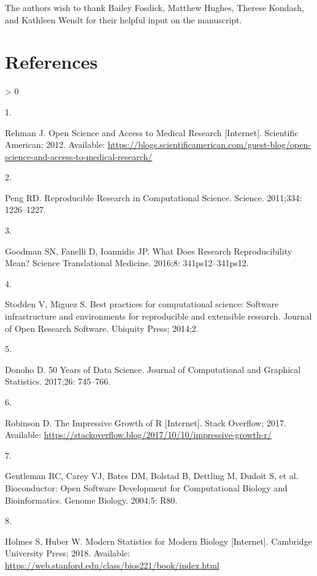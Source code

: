 \documentclass[10pt,letterpaper]{article}
\newlength{\csllabelwidth}
\newlength{\cslhangindent}
\newenvironment{CSLReferences}[3] %
 {%
  \setlength{\parindent}{0pt}
  \ifodd #1 \everypar{\setlength{\hangindent}{\cslhangindent}}\ignorespaces\fi
  \ifnum #2 > 0
  \setlength{\parskip}{#2\baselineskip}
  \fi
 }%
 {}
\newcommand{\CSLLeftMargin}[1]{\parbox[t]{\csllabelwidth}{#1}}
\newcommand{\CSLRightInline}[1]{\parbox[t]{\linewidth - \csllabelwidth}{#1}}
\begin{document}
The authors wish to thank Bailey Fosdick, Matthew Hughes, Therese
Kondash, and Kathleen Wendt for their helpful input on the manuscript.

\hypertarget{references}{%
\section*{References}\label{references}}

\hypertarget{refs}{}
\begin{CSLReferences}{0}{0}
\leavevmode\hypertarget{ref-rehman2012}{}%
\CSLLeftMargin{1. }
\CSLRightInline{Rehman J. {Open Science and Access to Medical Research}
{[}Internet{]}. Scientific American; 2012. Available:
\url{https://blogs.scientificamerican.com/guest-blog/open-science-and-access-to-medical-research/}}

\leavevmode\hypertarget{ref-peng2011}{}%
\CSLLeftMargin{2. }
\CSLRightInline{Peng RD. {Reproducible Research in Computational
Science}. Science. 2011;334: 1226--1227. }

\leavevmode\hypertarget{ref-goodman2016}{}%
\CSLLeftMargin{3. }
\CSLRightInline{Goodman SN, Fanelli D, Ioannidis JP. {What Does Research
Reproducibility Mean?} Science Translational Medicine. 2016;8:
341ps12--341ps12. }

\leavevmode\hypertarget{ref-stodden2013}{}%
\CSLLeftMargin{4. }
\CSLRightInline{Stodden V, Miguez S. Best practices for computational
science: Software infrastructure and environments for reproducible and
extensible research. Journal of Open Research Software. Ubiquity Press;
2014;2. }

\leavevmode\hypertarget{ref-donoho2017}{}%
\CSLLeftMargin{5. }
\CSLRightInline{Donoho D. {50 Years of Data Science}. Journal of
Computational and Graphical Statistics. 2017;26: 745--766. }

\leavevmode\hypertarget{ref-robinson2017}{}%
\CSLLeftMargin{6. }
\CSLRightInline{Robinson D. {The Impressive Growth of R} {[}Internet{]}.
Stack Overflow; 2017. Available:
\url{https://stackoverflow.blog/2017/10/10/impressive-growth-r/}}

\leavevmode\hypertarget{ref-gentleman2004}{}%
\CSLLeftMargin{7. }
\CSLRightInline{Gentleman RC, Carey VJ, Bates DM, Bolstad B, Dettling M,
Dudoit S, et al. {Bioconductor: Open Software Development for
Computational Biology and Bioinformatics}. Genome Biology. 2004;5: R80.
}

\leavevmode\hypertarget{ref-holmes2018}{}%
\CSLLeftMargin{8. }
\CSLRightInline{Holmes S, Huber W. {Modern Statistics for Modern
Biology} {[}Internet{]}. Cambridge University Press; 2018. Available:
\url{https://web.stanford.edu/class/bios221/book/index.html}}


\end{CSLReferences}
\end{document}
